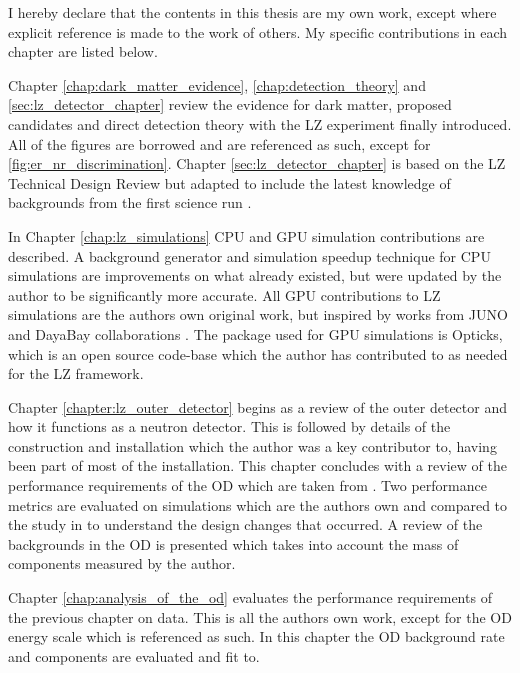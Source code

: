 \begin{SingleSpace}
I hereby declare that the contents in this thesis are my own work, except where explicit reference is made to the work of others.
My specific contributions in each chapter are listed below.
\vspace{1cm}
\par
Chapter \ref{chap:dark_matter_evidence}, \ref{chap:detection_theory} and \ref{sec:lz_detector_chapter} review the evidence for dark matter, proposed candidates and direct detection theory with the LZ experiment finally introduced.
All of the figures are borrowed and are referenced as such, except for \autoref{fig:er_nr_discrimination}.
Chapter \ref{sec:lz_detector_chapter} is based on the LZ Technical Design Review \cite{LZ_TechnicalDesignReview_ref} but adapted to include the latest knowledge of backgrounds from the first science run \cite{lz_sr1_backgrounds_ref}.
\par
In Chapter \ref{chap:lz_simulations} CPU and GPU simulation contributions are described.
A background generator and simulation speedup technique for CPU simulations are improvements on what already existed, but were updated by the author to be significantly more accurate.
All GPU contributions to LZ simulations are the authors own original work, but inspired by works from JUNO and DayaBay collaborations \cite{Opticks_CHEP_2019_ref}.
The package used for GPU simulations is Opticks, which is an open source code-base which the author has contributed to as needed for the LZ framework.
\par
Chapter \ref{chapter:lz_outer_detector} begins as a review of the outer detector and how it functions as a neutron detector.
This is followed by details of the construction and installation which the author was a key contributor to, having been part of most of the installation.
This chapter concludes with a review of the performance requirements of the OD which are taken from \cite{LZ_TechnicalDesignReview_ref}.
Two performance metrics are evaluated on simulations which are the authors own and compared to the study in \cite{LZ_TechnicalDesignReview_ref} to understand the design changes that occurred.
A review of the backgrounds in the OD is presented which takes into account the mass of components measured by the author.
\par
Chapter \ref{chap:analysis_of_the_od} evaluates the performance requirements of the previous chapter on data.
This is all the authors own work, except for the OD energy scale which is referenced as such.
In this chapter the OD background rate and components are evaluated and fit to.

\end{SingleSpace}
